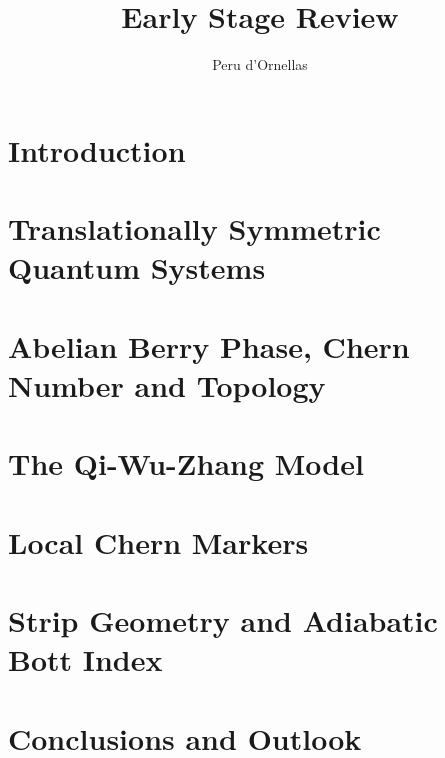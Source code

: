 \documentclass[11pt, oneside]{article}  	%
\title{\textbf{\huge{Early Stage Review}} \\
}
\author{Peru d'Ornellas}
\numberwithin{equation}{section}
\newcommand{\1}{\ensuremath{\mathbbm{1}}}
\begin{document}
\maketitle
\tableofcontents
\section{Introduction}


\section{Translationally Symmetric Quantum Systems}\label{sec:quantum_systems}


\section{Abelian Berry Phase, Chern Number and Topology} \label{sec:chern_number}


\section{The Qi-Wu-Zhang Model}\label{sec:QWZ}



\section{Local Chern Markers} \label{sec:local_chern_markers}


\section{Strip Geometry and Adiabatic Bott Index} \label{sec:strip_bott}


\section{Conclusions and Outlook}

\small

\normalsize

\end{document}
